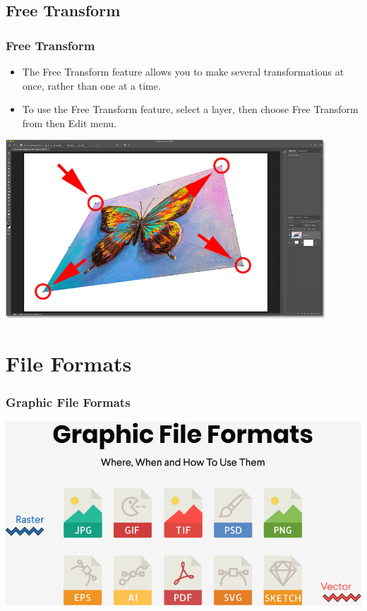 \documentclass{beamer}
\begin{document}
		\subsection{Free Transform}
\begin{frame}
	\frametitle{Free Transform}
	\begin{itemize}
		\item The Free Transform feature allows you to make several transformations at once, rather than one at a time.
		\item To use the Free Transform feature, select a layer, then choose Free Transform from then Edit menu.
	\end{itemize}
	\begin{center}
		\includegraphics[width = 0.9\textwidth]{images/free transform.jpg}
	\end{center}
\end{frame}


		
		
	\section{File Formats}	
	\begin{frame}
		\frametitle{Graphic File Formats}
		\begin{center}
			\includegraphics[width=1.0\textwidth]{images/Graphic-File-Formats.png}
		\end{center}
	\end{frame}
	
\end{document}
